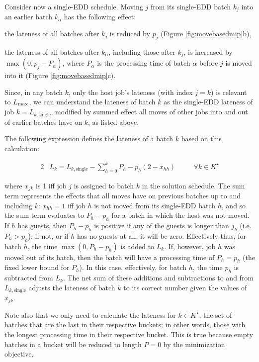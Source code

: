 \documentclass[13pt, letterpaper, oneside]{book}
\begin{document}


Consider now a single-EDD schedule. Moving $j$ from its single-EDD batch $k_j$ into an earlier
batch $k_\alpha$ has the following effect:
\begin{alist}
\item{the lateness of all batches after $k_j$ is reduced by $p_j$ (Figure
\ref{fig:movebasedmip}b),}
\item{the lateness of all batches after $k_\alpha$, including those after $k_j$,
is increased by $\max(0,p_j - P_\alpha)$, where $P_\alpha$ is the processing
time of batch $\alpha$ before $j$ is moved into it (Figure
\ref{fig:movebasedmip}c).}
\end{alist}
Since, in any batch $k$, only the host job's lateness (with index $j = k$) is
relevant to $L_{\text{max}}$, we can understand the lateness of batch $k$ as the
single-EDD lateness of job $k = L_{k,\text{single}}$, modified by summed effect
all moves of other jobs into and out of earlier batches have on $k$, as listed
above.
 
The following expression defines the lateness of a batch $k$ based on this
calculation:
 
\begin{alignat}{2} & L_k = L_{k,\text{single}} - \sum_{h=0}^{k} P_h - p_h(2 -
x_{hh}) \quad && \forall k \in K^\star \end{alignat}
 
where $x_{jk}$ is 1 iff job $j$ is assigned to batch $k$ in the solution
schedule. The sum term represents the effects that all moves have on previous
batches up to and including $k$: $x_{hh} = 1$ iff job $h$ is not moved from
its single-EDD batch $h$, and so the sum term evaluates to $P_h - p_h$ for a
batch in which the host was not moved. If $h$ has guests, then $P_h - p_h$ is
positive if any of the guests is longer than $j_h$ (i.e. $P_h > p_h$); if not,
or if $h$ has no guests at all, it will be zero. Effectively thus, for batch
$h$, the time $\max(0, P_h-p_h)$ is added to $L_k$. If, however, job $h$ was
moved out of its batch, then the batch will have a processing time of $P_h =
p_h$ (the fixed lower bound for $P_h$). In this case, effectively, for batch
$h$, the time $p_h$ is subtracted from $L_k$. The net sum of these additions
and subtractions to and from $L_{k,\text{single}}$ adjusts the lateness of
batch $k$ to its correct number given the values of $x_{jk}$. 

Note also that we only need to calculate the lateness for $k \in K^\star$, the set
of batches that are the last in their respective buckets; in other words, those
with the longest processing time in their respective bucket. This is true
because empty batches in a bucket will be reduced to length $P = 0$ by the
minimization objective.
\end{document}
